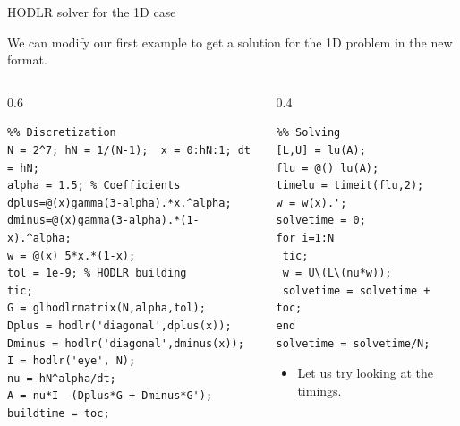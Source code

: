 \documentclass[aspectratio=169,xcolor=dvipsnames]{beamer}
\begin{document}
\begin{frame}[fragile]{HODLR solver for the 1D case}

We can modify our first example to get a solution for the 1D problem in the new format.\vspace{-1em}

\begin{columns}
\begin{column}{0.6\columnwidth}
\begin{verbatim}
%% Discretization
N = 2^7; hN = 1/(N-1);  x = 0:hN:1; dt = hN;
alpha = 1.5; % Coefficients
dplus=@(x)gamma(3-alpha).*x.^alpha;
dminus=@(x)gamma(3-alpha).*(1-x).^alpha;
w = @(x) 5*x.*(1-x);
tol = 1e-9; % HODLR building
tic;
G = glhodlrmatrix(N,alpha,tol);
Dplus = hodlr('diagonal',dplus(x));
Dminus = hodlr('diagonal',dminus(x));
I = hodlr('eye', N);
nu = hN^alpha/dt;
A = nu*I -(Dplus*G + Dminus*G');
buildtime = toc;
\end{verbatim}
\end{column}
\begin{column}{0.4\columnwidth}
\begin{verbatim}
%% Solving
[L,U] = lu(A);
flu = @() lu(A);
timelu = timeit(flu,2);
w = w(x).';
solvetime = 0;
for i=1:N
 tic;
 w = U\(L\(nu*w));
 solvetime = solvetime + toc;
end
solvetime = solvetime/N;
\end{verbatim}
\vspace{-1em}\begin{itemize}
	\item[\faClock]<2-> Let us try looking at the timings.
\end{itemize}
\end{column}
\end{columns}

\end{frame}
\end{document}
